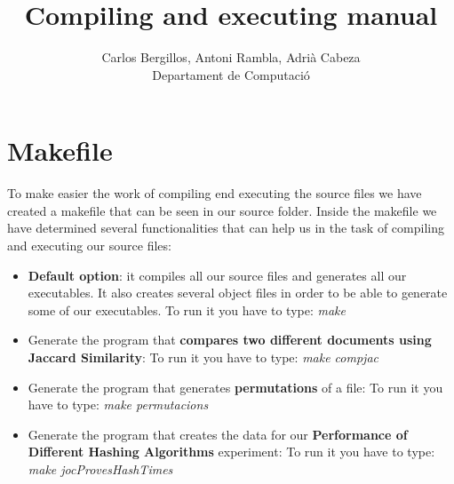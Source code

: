 \documentclass[12pt]{article}
\author{Carlos Bergillos, Antoni Rambla, Adrià Cabeza\\ Departament de Computació}
\title{Compiling and executing manual}
\begin{document}
  \maketitle  
   \newpage
   \section{Makefile}
   To make easier the work of compiling end executing the source files we have created a makefile that can be seen in our source folder. Inside the makefile we have determined several functionalities that can help us in the task of compiling and executing our source files:
   
   \begin{itemize}
   \item \textbf{Default option}: it compiles all our source files and generates all our executables. It also creates several object files in order to be able to generate some of our executables. 
   To run it you have to type: \textit{make}
   \item Generate the program that \textbf{compares two different documents using Jaccard Similarity}:
   To run it you have to type: \textit{make compjac}
  
  
   \item Generate the program that generates \textbf{permutations} of a file:
   To run it you have to type: \textit{make permutacions}
 
   
\item Generate the program that creates the data for our \textbf{Performance of Different Hashing Algorithms} experiment:
   To run it you have to type: \textit{make jocProvesHashTimes}
  

\end{itemize}
\end{document}
